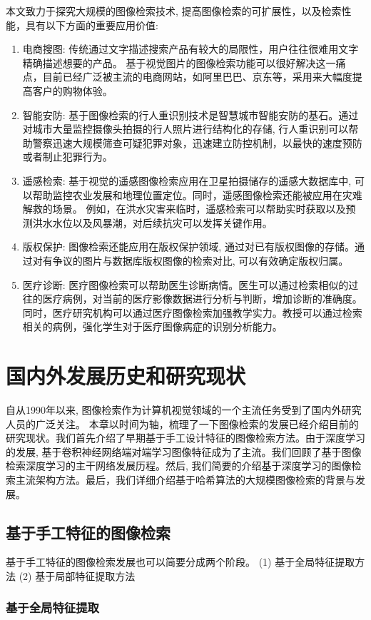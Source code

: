 本文致力于探究大规模的图像检索技术, 提高图像检索的可扩展性，以及检索性能，具有以下方面的重要应用价值:
\begin{enumerate}
    \item 电商搜图: 传统通过文字描述搜索产品有较大的局限性，用户往往很难用文字精确描述想要的产品。 基于视觉图片的图像检索功能可以很好解决这一痛点，目前已经广泛被主流的电商网站，如阿里巴巴、京东等，采用来大幅度提高客户的购物体验。
    \item 智能安防: 基于图像检索的行人重识别技术是智慧城市智能安防的基石。通过对城市大量监控摄像头拍摄的行人照片进行结构化的存储, 行人重识别可以帮助警察迅速大规模筛查可疑犯罪对象，迅速建立防控机制，以最快的速度预防或者制止犯罪行为。 
    \item 遥感检索: 基于视觉的遥感图像检索应用在卫星拍摄储存的遥感大数据库中, 可以帮助监控农业发展和地理位置定位。同时，遥感图像检索还能被应用在灾难解救的场景。 例如，在洪水灾害来临时，遥感检索可以帮助实时获取以及预测洪水水位以及风暴潮，对后续抗灾可以发挥关键作用。
    \item 版权保护: 图像检索还能应用在版权保护领域, 通过对已有版权图像的存储。通过对有争议的图片与数据库版权图像的检索对比, 可以有效确定版权归属。
    \item 医疗诊断: 医疗图像检索可以帮助医生诊断病情。医生可以通过检索相似的过往的医疗病例，对当前的医疗影像数据进行分析与判断，增加诊断的准确度。同时，医疗研究机构可以通过医疗图像检索加强教学实力。教授可以通过检索相关的病例，强化学生对于医疗图像病症的识别分析能力。
\end{enumerate}

\section{国内外发展历史和研究现状}
自从1990年以来, 图像检索作为计算机视觉领域的一个主流任务受到了国内外研究人员的广泛关注。 本章以时间为轴，梳理了一下图像检索的发展已经介绍目前的研究现状。我们首先介绍了早期基于手工设计特征的图像检索方法。由于深度学习的发展, 基于卷积神经网络端对端学习图像特征成为了主流。我们回顾了基于图像检索深度学习的主干网络发展历程。然后, 我们简要的介绍基于深度学习的图像检索主流架构方法。最后，我们详细介绍基于哈希算法的大规模图像检索的背景与发展。
\subsection{基于手工特征的图像检索}
\label{sec:manual}
基于手工特征的图像检索发展也可以简要分成两个阶段。 (1) 基于全局特征提取方法 (2) 基于局部特征提取方法
\subsubsection{基于全局特征提取}

